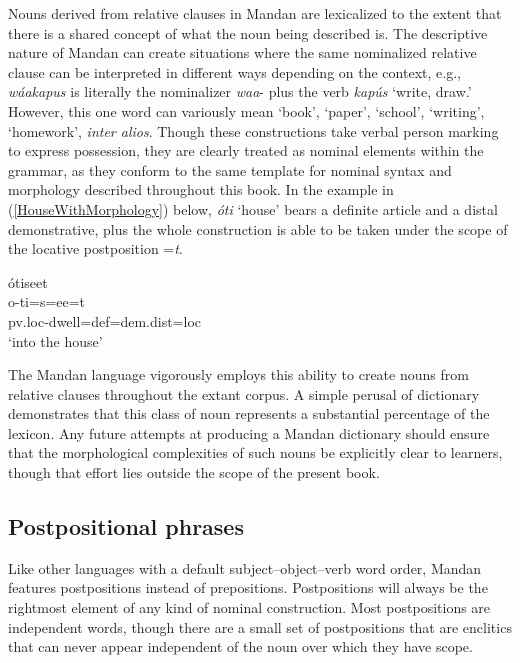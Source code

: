 Nouns derived from relative clauses in Mandan are lexicalized to the extent that there is a shared concept of what the noun being described is. The descriptive nature of Mandan can create situations where the same nominalized relative clause can be interpreted in different ways depending on the context, e.g., \textit{wáakapus} is literally the nominalizer \textit{waa}- plus the verb \textit{kapús} `write, draw.' However, this one word can variously mean `book', `paper', `school', `writing', `homework', \textit{inter alios}.
Though these constructions take verbal person marking to express possession, they are clearly treated as nominal elements within the grammar, as they conform to the same template for nominal syntax and morphology described throughout this book. In the example in (\ref{HouseWithMorphology}) below, \textit{óti} `house' bears a definite article and a distal demonstrative, plus the whole construction is able to be taken under the scope of the locative postposition =\textit{t}.

\begin{exe}
    \item\label{HouseWithMorphology} \glll ótiseet\\
    o-ti=s=ee=t\\
    pv.loc-\textnormal{dwell}=def=dem.dist=loc\\
    \glt `into the house' \citep[202]{hollow1973a}
\end{exe}

The Mandan language vigorously employs this ability to create nouns from relative clauses throughout the extant corpus. A simple perusal of  dictionary demonstrates that this class of noun represents a substantial percentage of the lexicon. Any future attempts at producing a Mandan dictionary should ensure that the morphological complexities of such nouns be explicitly clear to learners, though that effort lies outside the scope of the present book.


\subsection{Postpositional phrases}\label{Ch5PostpositionalPhrasesSec}

Like other languages with a default subject--object--verb word order, Mandan features postpositions instead of prepositions. Postpositions will always be the rightmost element of any kind of nominal construction. Most postpositions are independent words, though there are a small set of postpositions that are enclitics that can never appear independent of the noun over which they have scope. 

